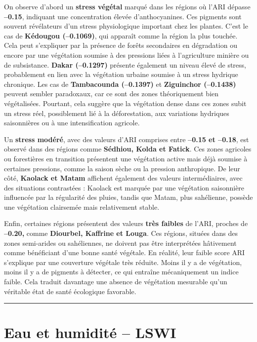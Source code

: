 \documentclass[
]{book}
\begin{document}
On observe d'abord un \textbf{stress végétal} marqué dans les régions où l'ARI dépasse \textbf{--0.15}, indiquant une concentration élevée d'anthocyanines. Ces pigments sont souvent révélateurs d'un stress physiologique important chez les plantes. C'est le cas de \textbf{Kédougou (--0.1069)}, qui apparaît comme la région la plus touchée. Cela peut s'expliquer par la présence de forêts secondaires en dégradation ou encore par une végétation soumise à des pressions liées à l'agriculture minière ou de subsistance. \textbf{Dakar (--0.1297)} présente également un niveau élevé de stress, probablement en lien avec la végétation urbaine soumise à un stress hydrique chronique. Les cas de \textbf{Tambacounda (--0.1397)} et \textbf{Ziguinchor (--0.1438)} peuvent sembler paradoxaux, car ce sont des zones théoriquement bien végétalisées. Pourtant, cela suggère que la végétation dense dans ces zones subit un stress réel, possiblement lié à la déforestation, aux variations hydriques saisonnières ou à une intensification agricole.

Un \textbf{stress modéré}, avec des valeurs d'ARI comprises entre \textbf{--0.15 et --0.18}, est observé dans des régions comme \textbf{Sédhiou, Kolda et Fatick}. Ces zones agricoles ou forestières en transition présentent une végétation active mais déjà soumise à certaines pressions, comme la saison sèche ou la pression anthropique. De leur côté, \textbf{Kaolack et Matam} affichent également des valeurs intermédiaires, avec des situations contrastées : Kaolack est marquée par une végétation saisonnière influencée par la régularité des pluies, tandis que Matam, plus sahélienne, possède une végétation clairsemée mais relativement stable.

Enfin, certaines régions présentent des valeurs \textbf{très faibles} de l'ARI, proches de \textbf{--0.20,} comme \textbf{Diourbel, Kaffrine et Louga}. Ces régions, situées dans des zones semi-arides ou sahéliennes, ne doivent pas être interprétées hâtivement comme bénéficiant d'une bonne santé végétale. En réalité, leur faible score ARI s'explique par une couverture végétale très réduite. Moins il y a de végétation, moins il y a de pigments à détecter, ce qui entraîne mécaniquement un indice faible. Cela traduit davantage une absence de végétation mesurable qu'un véritable état de santé écologique favorable.

\begin{center}\rule{0.5\linewidth}{0.5pt}\end{center}

\section{Eau et humidité -- LSWI}\label{eau-et-humidituxe9-lswi}
\end{document}

